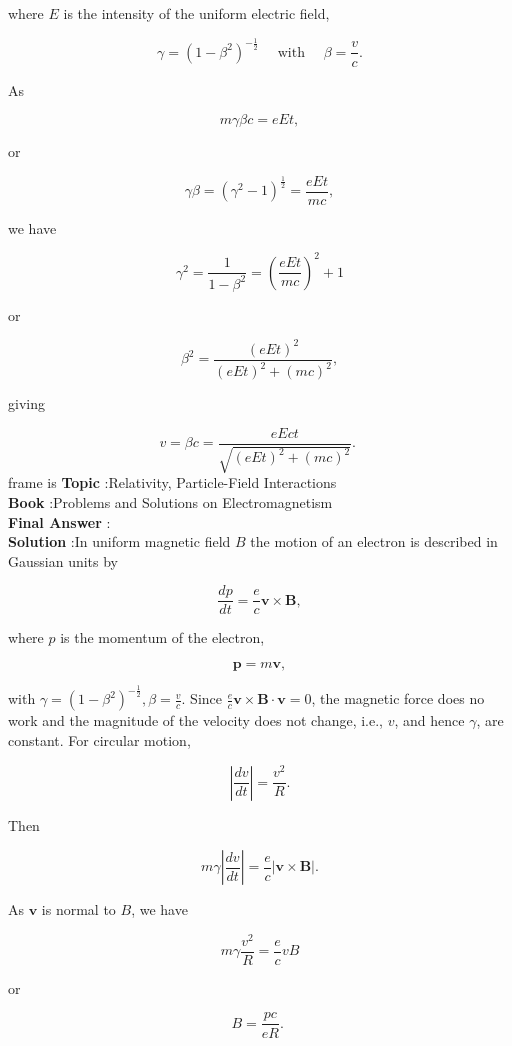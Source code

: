 \documentclass[10pt]{article}
\begin{document}
where $E$ is the intensity of the uniform electric field,

$$
\gamma=\left(1-\beta^{2}\right)^{-\frac{1}{2}} \quad \text { with } \quad \beta=\frac{v}{c} .
$$

 As

$$
m \gamma \beta c=e E t,
$$

or

$$
\gamma \beta=\left(\gamma^{2}-1\right)^{\frac{1}{2}}=\frac{e E t}{m c},
$$

we have

$$
\gamma^{2}=\frac{1}{1-\beta^{2}}=\left(\frac{e E t}{m c}\right)^{2}+1
$$

or

$$
\beta^{2}=\frac{(e E t)^{2}}{(e E t)^{2}+(m c)^{2}},
$$

giving

$$
v=\beta c=\frac{e E c t}{\sqrt{(e E t)^{2}+(m c)^{2}}} \text {. }
$$
frame is
\textbf{Topic} :Relativity, Particle-Field Interactions\\
\textbf{Book} :Problems and Solutions on Electromagnetism\\
\textbf{Final Answer} :\\


\textbf{Solution} :In uniform magnetic field $B$ the motion of an electron is described in Gaussian units by

$$
\frac{d p}{d t}=\frac{e}{c} \mathbf{v} \times \mathbf{B},
$$

where $p$ is the momentum of the electron,

$$
\mathbf{p}=m \boldsymbol{v},
$$

with $\gamma=\left(1-\beta^{2}\right)^{-\frac{1}{2}}, \beta=\frac{v}{c}$. Since $\frac{e}{c} \mathbf{v} \times \mathbf{B} \cdot \mathbf{v}=0$, the magnetic force does no work and the magnitude of the velocity does not change, i.e., $v$, and hence $\gamma$, are constant. For circular motion,

$$
\left|\frac{d v}{d t}\right|=\frac{v^{2}}{R} .
$$

Then

$$
m \gamma\left|\frac{d v}{d t}\right|=\frac{e}{c}|\mathbf{v} \times \mathbf{B}| .
$$

As $\mathbf{v}$ is normal to $B$, we have

$$
m \gamma \frac{v^{2}}{R}=\frac{e}{c} v B
$$

or

$$
B=\frac{p c}{e R} \text {. }
$$
\end{document}
